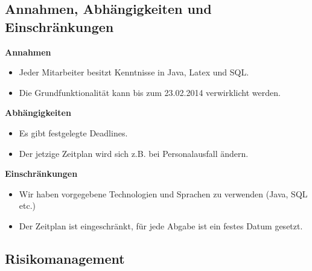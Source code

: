 \subsection{Annahmen, Abhängigkeiten und Einschränkungen}

\textbf{Annahmen}
\begin{itemize}
 \item Jeder Mitarbeiter besitzt Kenntnisse in Java, Latex und SQL.
 \item Die Grundfunktionalität kann bis zum 23.02.2014 verwirklicht werden.
\end{itemize}

\textbf{Abhängigkeiten}
\begin{itemize}
 \item Es gibt festgelegte Deadlines.
 \item Der jetzige Zeitplan wird sich z.B. bei Personalausfall ändern.
\end{itemize}

\textbf{Einschränkungen}
\begin{itemize}
 \item Wir haben vorgegebene Technologien und Sprachen zu verwenden (Java, SQL etc.) 
 \item Der Zeitplan ist eingeschränkt, für jede Abgabe ist ein festes Datum gesetzt.

\end{itemize}

\subsection{Risikomanagement}\label{riskmanagement}
 